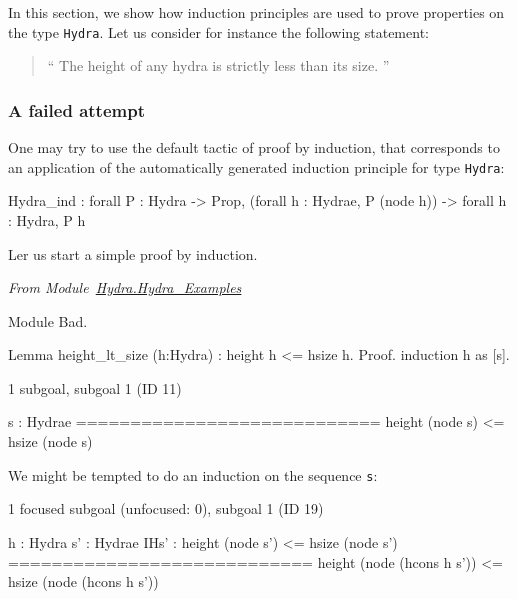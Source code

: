\documentclass[a4paper]{book}
\begin{document}
In this section, we show how induction principles are used to prove properties on the type 
\texttt{Hydra}. Let us consider for instance the following statement:
\begin{quote}
  `` The height of any hydra is strictly less than its size. ''
\end{quote}



\subsubsection{A failed attempt}

One may try to use the default tactic of proof by induction, that corresponds to an application of the automatically  generated  induction principle for  type \texttt{Hydra}:

\begin{Coqanswer}
Hydra_ind :
forall P : Hydra -> Prop,
(forall h : Hydrae, P (node h)) -> forall h : Hydra, P h
\end{Coqanswer}

Ler us start a simple proof by induction.

\vspace{4pt}
\emph{From Module~\href{../src/html/hydras.Hydra.Hydra_Examples.html}{Hydra.Hydra\_Examples}}

\begin{Coqbad}
Module Bad.

Lemma height_lt_size (h:Hydra) :
  height h <= hsize h.
Proof.
  induction h as [s].
\end{Coqbad}

\begin{Coqanswer}
1 subgoal, subgoal 1 (ID 11)
  
  s : Hydrae
  ============================
   height (node s) <= hsize (node s)
\end{Coqanswer}

We might be tempted to do an induction on the sequence \texttt{s}:



\begin{Coqanswer}
 1 focused subgoal
(unfocused: 0), subgoal 1 (ID 19)
  
  h : Hydra
  s' : Hydrae
  IHs' : height (node s') <= hsize (node s')
  ============================
   height (node (hcons h s')) <= hsize (node (hcons h s'))

\end{Coqanswer}
\end{document}

